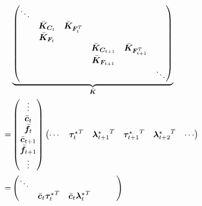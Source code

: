 \documentclass[a4paper,11pt]{article}
\renewcommand\b\bm
\begin{document}
\begin{align}
      & \underbrace{
        \begin{pmatrix}
            \ddots &                       &                         &                           &                             &        \\
                   & \bar{\b{K}}_{\b{C}_t} & \bar{\b{K}}_{\b{F}_t^T} &                           &                             &        \\
                   & \bar{\b{K}}_{\b{F}_t} &                         &                           &                             &        \\
                   &                       &                         & \bar{\b{K}}_{\b{C}_{t+1}} & \bar{\b{K}}_{\b{F}^T_{t+1}} &        \\
                   &                       &                         & \bar{\b{K}}_{\b{F}_{t+1}} &                             &        \\
                   &                       &                         &                           &                             & \ddots
        \end{pmatrix}}_{\bar{\b{K}}} \\
    = &
    \begin{pmatrix}
        \vdots            \\
        \bar{\b{c}}_t     \\
        \bar{\b{f}}_t     \\
        \bar{\b{c}}_{t+1} \\
        \bar{\b{f}}_{t+1} \\
        \vdots
    \end{pmatrix}
    \begin{pmatrix}
        \cdots
         & {\b{\tau}_t^\star}^T
         & {\b{\lambda}_{t+1} ^\star}^T
         & {\b{\tau}_{t+1}^\star}^T
         & {\b{\lambda}_{t+2}^\star}^T
         & \cdots
    \end{pmatrix}
    \\
    \label{eq:kbar_outer_product}
    = &
    \begin{pmatrix}
        \ddots &                                        &                                       &                                              &                                               &        \\
               & \bar{\b{c}}_t {\b{\tau}_t^\star}^T     & \bar{\b{c}}_t {\b{\lambda}_t^\star}^T &                                              &                                               &        \\

\end{pmatrix}
\end{align}
\end{document}
